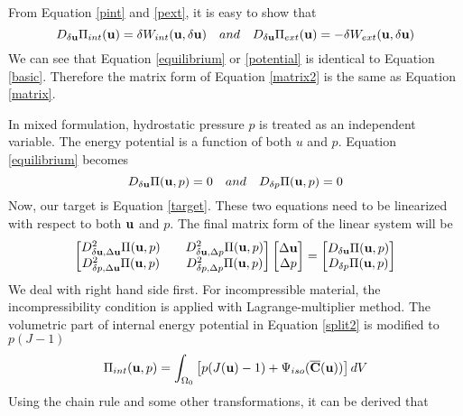 From Equation \ref{pint} and \ref{pext}, it is easy to show that
\begin{equation}
D_{\delta\bold{u}}\Pi_{int}(\bold{u}) = \delta W_{int}(\bold{u}, \delta\bold{u}) \quad and \quad
D_{\delta\bold{u}}\Pi_{ext}(\bold{u}) = - \delta W_{ext}(\bold{u}, \delta\bold{u})
\end{equation}
We can see that Equation \ref{equilibrium} or \ref{potential} is identical to Equation \ref{basic}. Therefore the matrix form of Equation \ref{matrix2} is the same as Equation \ref{matrix}.

In mixed formulation, hydrostatic pressure $p$ is treated as an independent variable. The energy potential is a function of both $u$ and $p$. Equation \ref{equilibrium} becomes
\begin{equation} \label{target}
D_{\delta\bold{u}}\Pi(\bold{u}, p) = 0 \quad and \quad D_{\delta{p}}\Pi(\bold{u}, p) = 0
\end{equation}
Now, our target is Equation \ref{target}. These two equations need to be linearized with respect to both $\bold{u}$ and $p$. The final matrix form of the linear system will be
\begin{equation} \label{linear}
\begin{bmatrix} %
D_{\delta\bold{u}, \Delta\bold{u}}^2 \Pi(\bold{u}, p)  && D_{\delta\bold{u}, \Delta{p}}^2 \Pi(\bold{u}, p)  \\ D_{\delta{p}, \Delta\bold{u}}^2 \Pi(\bold{u}, p)  && D_{\delta{p}, \Delta{p}}^2 \Pi(\bold{u}, p) 
\end{bmatrix}
\begin{bmatrix}
\Delta\bold{u} \\ \Delta{p}
\end{bmatrix}
= 
\begin{bmatrix}
D_{\delta\bold{u}}\Pi(\bold{u}, p) \\ D_{\delta{p}}\Pi(\bold{u}, p) 
\end{bmatrix}
\end{equation}
We deal with right hand side first. For incompressible material, the incompressibility condition is applied with Lagrange-multiplier method. The volumetric part of internal energy potential in Equation \ref{split2} is modified to $p(J - 1)$
\begin{equation} \label{split3}
\Pi_{int}(\bold{u}, p) = \int_{\Omega_0} \left[ p(J(\bold{u}) - 1) + \Psi_{iso}(\overline{\bold{C}}(\bold{u}))\right] dV
\end{equation}
Using the chain rule and some other transformations, it can be derived that
